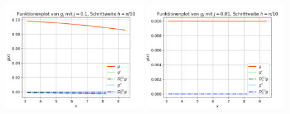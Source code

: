 \documentclass{scrartcl}
\begin{document}
{    \includegraphics[width=0.45\textwidth]{Grafiken/Funktionenplot_j01_Pi_Zehntel}
    \includegraphics[width=0.45\textwidth]{Grafiken/Funktionenplot_j001_Pi_Zehntel}\\
    \vspace{-0.2cm}

}
\end{document}
